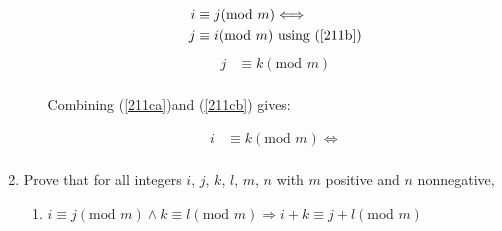 \documentclass[10pt,\jkfside,a4paper]{article}
\begin{document}
\begin{enumerate}
\begin{enumerate}
\begin{equation}\label{211ca}
\begin{split}
i &\equiv j (\text{mod } m) \Longleftrightarrow\\
j &\equiv i (\text{mod } m)\text{ using (\ref{211b})}\\
\end{split}
\end{equation}
\begin{equation}\label{211cb}
\begin{split}
j &\equiv k(\text{mod } m)\\
\end{split}
\end{equation}
\begin{center}
Combining (\ref{211ca})and (\ref{211cb}) gives:
\end{center}
\begin{equation}
\begin{split}
i &\equiv k(\text{mod } m) \Longleftrightarrow\\
\end{split}
\end{equation}

\end{enumerate}

\item Prove that for all integers $i$, $j$, $k$, $l$, $m$, $n$ with $m$ positive and $n$ nonnegative,

\begin{enumerate}

\item $i \equiv j (\text{mod } m) \wedge k \equiv l (\text{mod } m) \Longrightarrow i + k \equiv j + l (\text{mod } m)$


\end{enumerate}
\end{enumerate}
\end{document}
